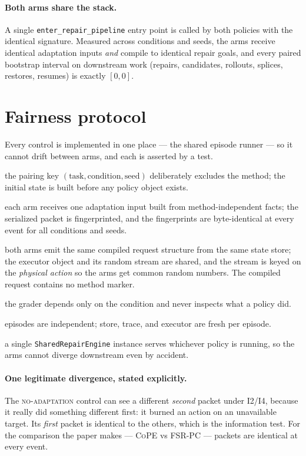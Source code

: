\documentclass[11pt]{article}
\newcommand{\cope}{\textsc{CoPE}}
\newcommand{\fsrpc}{\textsc{FSR-PC}}
\newcommand{\noadapt}{\textsc{no-adaptation}}
\begin{document}
\paragraph{Both arms share the stack.} A single
\texttt{enter\_repair\_pipeline} entry point is called by both policies with the
identical signature. Measured across conditions and seeds, the arms receive
identical adaptation inputs \emph{and} compile to identical repair goals, and
every paired bootstrap interval on downstream work (repairs, candidates,
rollouts, splices, restores, resumes) is exactly $[0,0]$.

\section{Fairness protocol}

Every control is implemented in one place --- the shared episode runner --- so
it cannot drift between arms, and each is asserted by a test.

\begin{description}[leftmargin=1.4em,style=nextline]
\item[F1 same task] the pairing key $(\text{task},\text{condition},\text{seed})$
deliberately excludes the method; the initial state is built before any policy
object exists.
\item[F2 same information] each arm receives one adaptation input built from
method-independent facts; the serialized packet is fingerprinted, and the
fingerprints are byte-identical at every event for all conditions and seeds.
\item[F3 same executor] both arms emit the same compiled request structure from
the same state store; the executor object and its random stream are shared, and
the stream is keyed on the \emph{physical action} so the arms get common random
numbers. The compiled request contains no method marker.
\item[F4 same budget, horizon, grader, metric code] the grader depends only on
the condition and never inspects what a policy did.
\item[F5 no cross-contamination] episodes are independent; store, trace, and
executor are fresh per episode.
\item[F6 one shared repair engine] a single \texttt{SharedRepairEngine} instance
serves whichever policy is running, so the arms cannot diverge downstream even
by accident.
\end{description}

\paragraph{One legitimate divergence, stated explicitly.}
The \noadapt{} control can see a different \emph{second} packet under I2/I4,
because it really did something different first: it burned an action on an
unavailable target. Its \emph{first} packet is identical to the others, which is
the information test. For the comparison the paper makes --- \cope{} vs
\fsrpc{} --- packets are identical at every event.
\end{document}
